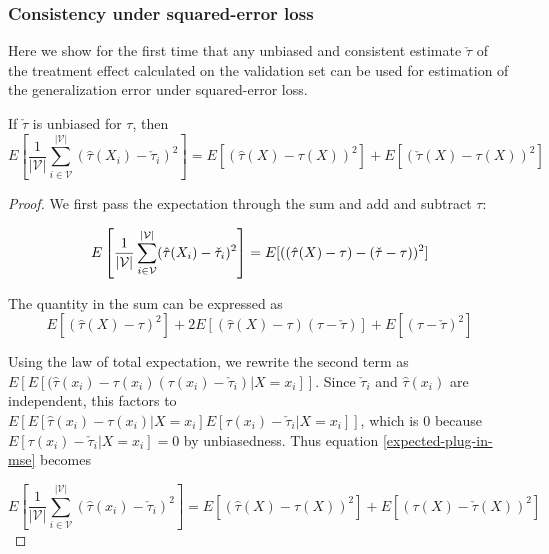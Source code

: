 \subsubsection{Consistency under squared-error loss}

Here we show for the first time that any unbiased and consistent estimate $\check\tau$ of the treatment effect calculated on the validation set can be used for estimation of the generalization error under squared-error loss. 

\begin{theorem}
If $\check\tau$ is unbiased for $\tau$, then 
\[
E\left[\frac{1}{|\mathcal{V}|}\sum_{i \in \mathcal{V}}^{|\mathcal{V}|}  (\hat \tau(X_i) - \check \tau_i)^2\right] = E[(\hat\tau(X) - \tau(X))^2] + E[(\check\tau(X) - \tau(X))^2]
\]
\end{theorem}

\begin{proof}

We first pass the expectation through the sum and add and subtract $\tau$:

\begin{equation}
	E\left[ \frac{1}{|\mathcal{V}|}\sum_{i \in \mathcal{V}}^{|\mathcal{V}|}  (\hat \tau(X_i) - \check \tau_i)^2 \right]  
	= 
	E[ ((\hat \tau(X) - \tau)  - (\check \tau-\tau))^2 ] \\
\label{expected-plug-in-mse}
\end{equation}

The quantity in the sum can be expressed as
\[
E[ (\hat \tau(X) - \tau)^2] + 2E[(\hat \tau(X) - \tau)(\tau - \check\tau)] + E[(\tau - \check\tau)^2]
\]

Using the law of total expectation, we rewrite the second term as $E[E[(\hat \tau(x_i) - \tau(x_i)(\tau(x_i) - \check\tau_i)|X=x_i]]$. Since $\check\tau_i$ and $\hat\tau(x_i)$ are independent, this factors to $E[E[\hat \tau(x_i) - \tau(x_i)|X=x_i]E[\tau(x_i) - \check\tau_i|X=x_i]]$, which is $0$ because $E[\tau(x_i) - \check\tau_i|X=x_i] = 0$ by unbiasedness. Thus equation \ref{expected-plug-in-mse} becomes

\[
	E\left[ \frac{1}{|\mathcal{V}|}\sum_{i \in \mathcal{V}}^{|\mathcal{V}|}  (\hat \tau(x_i) - \check \tau_i)^2 \right]  
	=
	E[ (\hat \tau(X) - \tau(X))^2] + E[(\tau(X) - \check\tau(X))^2]
\]

\end{proof}

